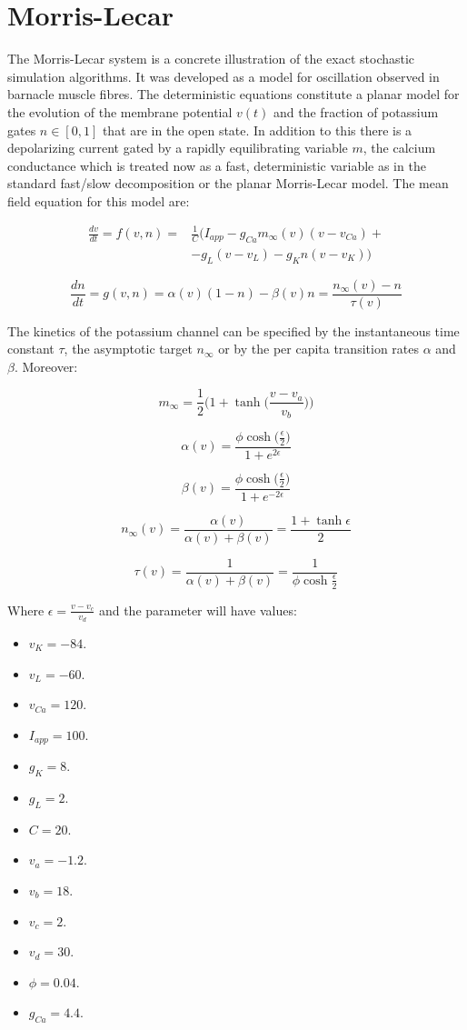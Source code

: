 \section{Morris-Lecar}
The Morris-Lecar system is a concrete illustration of the exact stochastic simulation algorithms.
It was developed as a model for oscillation observed in barnacle muscle fibres.
The deterministic equations constitute a planar model for the evolution of the membrane potential $v(t)$ and the fraction of potassium gates $n\in[0,1]$ that are in the open state.
In addition to this there is a depolarizing current gated by a rapidly equilibrating variable $m$, the calcium conductance which is treated now as a fast, deterministic variable as in the standard fast/slow decomposition or the planar Morris-Lecar model.
The mean field equation for this model are:

\begin{align*}
	\frac{dv}{dt} = f(v, n) =& \frac{1}{C}(I_{app}-g_{Ca}m_{\infty}(v)(v-v_{Ca})+\\
													 &-g_L(v-v_L)-g_Kn(v-v_K))
\end{align*}

$$\frac{dn}{dt} = g(v, n) = \alpha(v)(1-n)-\beta(v)n = \frac{n_{\infty}(v)-n}{\tau(v)}$$

The kinetics of the potassium channel can be specified by the instantaneous time constant $\tau$, the asymptotic target $n_{\infty}$ or by the per capita transition rates $\alpha$ and $\beta$.
Moreover:

$$m_{\infty} = \frac{1}{2}\biggl(1+\tanh\biggl(\frac{v-v_a}{v_b}\biggr)\biggr)$$

$$\alpha(v) = \frac{\phi\cosh\bigl(\frac{\epsilon}{2}\bigr)}{1+e^{2\epsilon}}$$

$$\beta(v) = \frac{\phi\cosh\bigl(\frac{\epsilon}{2}\bigr)}{1+e^{-2\epsilon}}$$

$$n_\infty(v) = \frac{\alpha(v)}{\alpha(v)+\beta(v)} = \frac{1+\tanh\epsilon}{2}$$

$$\tau(v) = \frac{1}{\alpha(v)+\beta(v)} = \frac{1}{\phi\cosh\frac{\epsilon}{2}}$$

Where $\epsilon = \frac{v-v_c}{v_d}$ and the parameter will have values:

\begin{multicols}{3}
	\begin{itemize}
		\item $v_K = -84$.
		\item $v_L = -60$.
		\item $v_{Ca} = 120$.
		\item $I_{app} = 100$.
		\item $g_K = 8$.
		\item $g_L = 2$.
		\item $C = 20$.
		\item $v_a = -1.2$.
		\item $v_b = 18$.
		\item $v_c = 2$.
		\item $v_d = 30$.
		\item $\phi = 0.04$.
		\item $g_{Ca} = 4.4$.
	\end{itemize}
\end{multicols}

